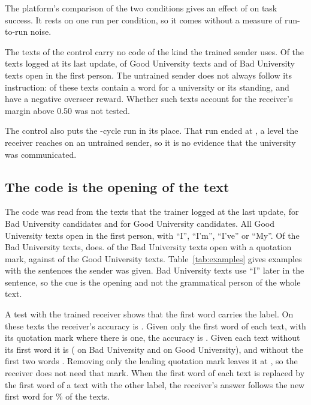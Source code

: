 \documentclass[11pt,a4paper]{article}
\begin{document}
The platform's comparison of the two conditions gives an effect of \CompareEffect{} on task success. It
rests on one run per condition, so it comes without a measure of run-to-run noise.

The texts of the control carry no code of the kind the trained sender uses. Of the \ControlEndTexts{} texts
logged at its last update, \ControlEndGoodFirst{} of \ControlEndGood{} Good University texts and
\ControlEndBadFirst{} of \ControlEndBad{} Bad University texts open in the first person. The untrained
sender does not always follow its instruction: \ControlEndUniversityWords{} of these texts contain a word
for a university or its standing, and \ControlEndNegative{} have a negative overseer reward. Whether such
texts account for the receiver's margin above 0.50 was not tested.

The control also puts the \ShortCycles{}-cycle run in its place. That run ended at \ShortTaskSuccess{}, a
level the receiver reaches on an untrained sender, so it is no evidence that the university was
communicated.

\subsection{The code is the opening of the text}

The code was read from the \EndTexts{} texts that the trainer logged at the last update, \EndBad{} for Bad
University candidates and \EndGood{} for Good University candidates. All \EndGoodFirst{} Good University
texts open in the first person, with ``I'', ``I'm'', ``I've'' or ``My''. Of the \EndBad{} Bad University
texts, \EndBadFirst{} does. \EndBadQuote{} of the Bad University texts open with a quotation mark, against
\EndGoodQuote{} of the Good University texts. Table~\ref{tab:examples} gives examples with the sentences
the sender was given. Bad University texts use ``I'' later in the sentence, so the cue is the opening and
not the grammatical person of the whole text.

A test with the trained receiver shows that the first word carries the label. On these \EndTexts{} texts
the receiver's accuracy is \TestUnchanged{}. Given only the first word of each text, with its quotation
mark where there is one, the accuracy is \TestOnlyFirst{}. Given each text without its first word it is
\TestWithoutFirst{} (\TestWithoutFirstBad{} on Bad University and \TestWithoutFirstGood{} on Good
University), and without the first two words \TestWithoutTwo{}. Removing only the leading quotation mark
leaves it at \TestQuoteRemoved{}, so the receiver does not need that mark. When the first word of each text
is replaced by the first word of a text with the other label, the receiver's answer follows the new first
word for \TestSplicePercent{}\% of the texts.
\end{document}

